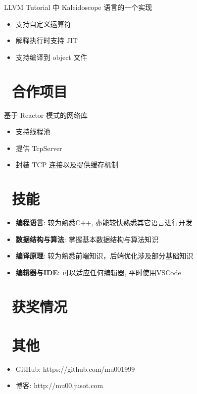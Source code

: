 \documentclass{resume}
\begin{document}
LLVM Tutorial 中 Kaleidoscope 语言的一个实现
\begin{onehalfspacing}
\begin{itemize}
  \item 支持自定义运算符
  \item 解释执行时支持 JIT
  \item 支持编译到 object 文件
\end{itemize}
\end{onehalfspacing}

\section{\faObjectGroup\ 合作项目}
基于 Reactor 模式的网络库
\begin{onehalfspacing}
\begin{itemize}
  \item 支持线程池
  \item 提供 TcpServer
  \item 封装 TCP 连接以及提供缓存机制
\end{itemize}
\end{onehalfspacing}


\section{\faCogs\ 技能}
\begin{itemize}[parsep=0.5ex]
  \item \textbf{编程语言}: 较为熟悉C++, 亦能较快熟悉其它语言进行开发
  \item \textbf{数据结构与算法}: 掌握基本数据结构与算法知识
  \item \textbf{编译原理}: 较为熟悉前端知识，后端优化涉及部分基础知识
  \item \textbf{编辑器与IDE}: 可以适应任何编辑器, 平时使用VSCode
\end{itemize}

\section{\faHeartO\ 获奖情况}

\section{\faInfo\ 其他}
\begin{itemize}[parsep=0.5ex]
  \item GitHub: https://github.com/mu001999
  \item 博客: http://mu00.jusot.com
\end{itemize}

%
%
\end{document}
